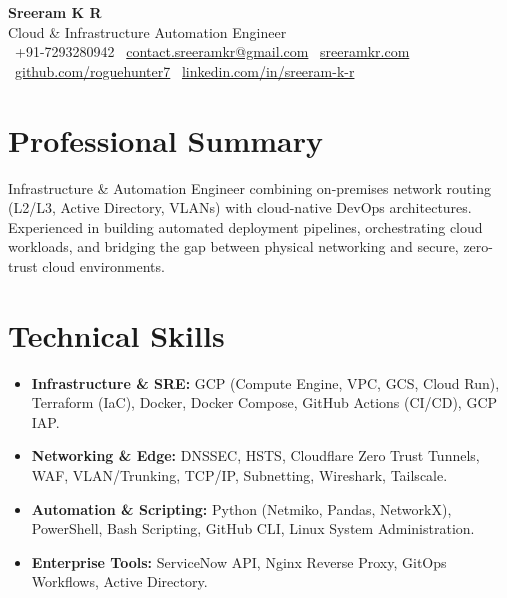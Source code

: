 \documentclass[10pt,letterpaper]{article}
\begin{document}
\color{primarycolor}

\begin{center}
    {\Huge\bfseries Sreeram K R}\\
    \smallskip
    {\large Cloud \& Infrastructure Automation Engineer}\\
    \smallskip
    \small
    \faPhone\ +91-7293280942 \quad\textbar\quad 
    \faEnvelope\ \href{mailto:contact.sreeramkr@gmail.com}{contact.sreeramkr@gmail.com} \quad\textbar\quad
    \faGlobe\ \href{https://sreeramkr.com}{sreeramkr.com}\\
    \smallskip
    \faGithub\ \href{https://github.com/roguehunter7}{github.com/roguehunter7} \quad\textbar\quad
    \faLinkedin\ \href{https://linkedin.com/in/sreeram-k-r}{linkedin.com/in/sreeram-k-r}
\end{center}

\section{Professional Summary}
Infrastructure \& Automation Engineer combining on-premises network routing (L2/L3, Active Directory, VLANs) with cloud-native DevOps architectures. Experienced in building automated deployment pipelines, orchestrating cloud workloads, and bridging the gap between physical networking and secure, zero-trust cloud environments.

\section{Technical Skills}
\begin{itemize}[leftmargin=1.5em, itemsep=1pt, parsep=0pt]
    \item \textbf{Infrastructure \& SRE:} GCP (Compute Engine, VPC, GCS, Cloud Run), Terraform (IaC), Docker, Docker Compose, GitHub Actions (CI/CD), GCP IAP.
    \item \textbf{Networking \& Edge:} DNSSEC, HSTS, Cloudflare Zero Trust Tunnels, WAF, VLAN/Trunking, TCP/IP, Subnetting, Wireshark, Tailscale.
    \item \textbf{Automation \& Scripting:} Python (Netmiko, Pandas, NetworkX), PowerShell, Bash Scripting, GitHub CLI, Linux System Administration.
    \item \textbf{Enterprise Tools:} ServiceNow API, Nginx Reverse Proxy, GitOps Workflows, Active Directory.
\end{itemize}
\end{document}
